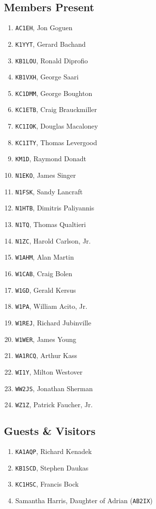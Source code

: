 \documentclass[10pt,letterpaper]{article}
\begin{document}
\subsection{Members Present}
\begin{enumerate}
\item \texttt{AC1EH}, Jon Goguen
\item \texttt{K1YYT}, Gerard Bachand
\item \texttt{KB1LOU}, Ronald Diprofio
\item \texttt{KB1VXH}, George Saari
\item \texttt{KC1DMM}, George Boughton
\item \texttt{KC1ETB}, Craig Brauckmiller
\item \texttt{KC1IOK}, Douglas Macaloney
\item \texttt{KC1ITY}, Thomas Levergood
\item \texttt{KM1D}, Raymond Donadt
\item \texttt{N1EKO}, James Singer
\item \texttt{N1FSK}, Sandy Lancraft
\item \texttt{N1HTB}, Dimitris Paliyannis
\item \texttt{N1TQ}, Thomas Qualtieri
\item \texttt{N1ZC}, Harold Carlson, Jr.
\item \texttt{W1AHM}, Alan Martin
\item \texttt{W1CAB}, Craig Bolen
\item \texttt{W1GD}, Gerald Kersus
\item \texttt{W1PA}, William Acito, Jr.
\item \texttt{W1REJ}, Richard Jubinville
\item \texttt{W1WER}, James Young
\item \texttt{WA1RCQ}, Arthur Kass
\item \texttt{WI1Y}, Milton Westover
\item \texttt{WW2JS}, Jonathan Sherman
\item \texttt{WZ1Z}, Patrick Faucher, Jr.
\end{enumerate}

\subsection{Guests \& Visitors}
\begin{enumerate}
\item \texttt{KA1AQP}, Richard Kenadek
\item \texttt{KB1SCD}, Stephen Daukas
\item \texttt{KC1HSC}, Francis Bock
\item Samantha Harris, Daughter of Adrian (\texttt{AB2IX})
\end{enumerate}
\end{document}
